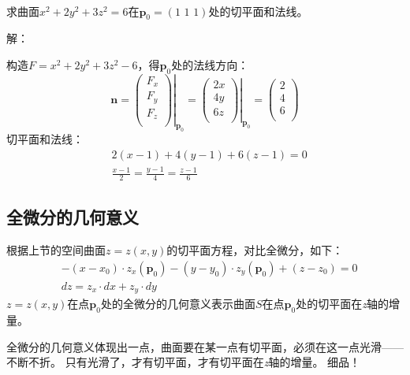 ~

\begin{example}
求曲面$x^2+2y^2+3z^2=6$在$\boldsymbol{p}_0=\left( 1\,\,1\,\,1 \right) $处的切平面和法线。
\end{example}

解：

构造$F=x^2+2y^2+3z^2-6$，得$\boldsymbol{p}_0$处的法线方向：
\[
\boldsymbol{n}=\left. \left( \begin{array}{c}
	F_x\\
	F_y\\
	F_z\\
\end{array} \right) \right|_{\boldsymbol{p}_0}=\left. \left( \begin{array}{c}
	2x\\
	4y\\
	6z\\
\end{array} \right) \right|_{\boldsymbol{p}_0}=\left( \begin{array}{c}
	2\\
	4\\
	6\\
\end{array} \right)
\]
切平面和法线：
\begin{align*}
&2\left( x-1 \right) +4\left( y-1 \right) +6\left( z-1 \right) =0 \\
&\frac{x-1}{2}=\frac{y-1}{4}=\frac{z-1}{6}
\end{align*}

\subsection{全微分的几何意义}

根据上节的空间曲面$z=z\left( x,y \right) $的切平面方程，对比全微分，如下：
\begin{align*}
&-\left( x-x_0 \right) \cdot z_x\left( \boldsymbol{p}_0 \right) -\left( y-y_0 \right) \cdot z_y\left( \boldsymbol{p}_0 \right) +\left( z-z_0 \right) =0 \\
&dz=z_x\cdot dx+z_y\cdot dy
\end{align*}
$z=z\left( x,y \right) $在点$\boldsymbol{p}_0$处的全微分的几何意义表示曲面$S$在点$\boldsymbol{p}_0$处的切平面在{\it z}轴的增量。

全微分的几何意义体现出一点，曲面要在某一点有切平面，必须在这一点光滑——不断不折。
只有光滑了，才有切平面，才有切平面在{\it z}轴的增量。
细品！

